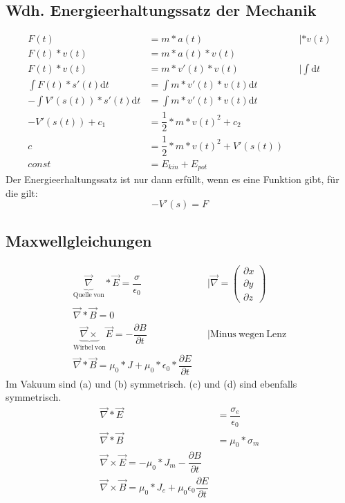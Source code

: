 \subsection{Wdh. Energieerhaltungssatz der Mechanik}
\begin{align}
	F(t)&=m*a(t)&&|*v(t)\\
	F(t)*v(t)&=m*a(t)*v(t)\\
	F(t)*v(t)&=m*v'(t)*v(t)&&|\int \mathrm{d}t\\
	\int F(t)*s'(t)\mathrm{d}t&=\int m*v'(t)*v(t)\mathrm{d}t\\
	-\int V'(s(t))*s'(t)\mathrm{d}t&=\int m*v'(t)*v(t)\mathrm{d}t\\
	-V'(s(t))+c_1&=\dfrac{1}{2}*m*v(t)^2+c_2\\
	c&=\dfrac{1}{2}*m*v(t)^2+V'(s(t))\\
	const&=E_{kin}+E_{pot}
\end{align}
Der Energieerhaltungssatz ist nur dann erfüllt, wenn es eine Funktion gibt, für die gilt: \[-V'(s)=F\]

\subsection{Maxwellgleichungen}
\begin{subequations}
	\begin{align}
	\underbrace{\vec{\nabla}}_{\mathrm{Quelle\ von}}\ast\vec{E}=\dfrac{\sigma}{\epsilon_0}&&|\vec{\nabla}=\begin{pmatrix}\partial x\\\partial y\\\partial z\end{pmatrix}\\
	\vec{\nabla} \ast\vec{B}=0\\
	\underbrace{\vec{\nabla} \times}_{\mathrm{Wirbel\ von}} \vec{E}=-\dfrac{\partial B}{\partial t}&&|\mathrm{ Minus\ wegen\ Lenz}\\
	\vec{\nabla} * \vec{B}=\mu_0*J+\mu_0*\epsilon_0*\dfrac{\partial E}{\partial t}
	\end{align}
\end{subequations}
Im Vakuum sind (a) und (b) symmetrisch. (c) und (d) sind ebenfalls symmetrisch.
\begin{subequations}
	\begin{align}
		\vec{\nabla}\ast\vec{E}&=\dfrac{\sigma_e}{\epsilon_0}\\
		\vec{\nabla}\ast\vec{B}&=\mu_0*\sigma_m\\
		\vec{\nabla}\times \vec{E}=-\mu_0*J_m-\dfrac{\partial B}{\partial t}\\
		\vec{\nabla} \times \vec{B}=\mu_0*J_e+\mu_0\epsilon_0\dfrac{\partial E}{\partial t}	
	\end{align}
\end{subequations}



